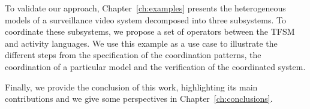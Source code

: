 To validate our approach, Chapter~\ref{ch:examples} presents the heterogeneous models of a surveillance video system decomposed into three subsystems. To coordinate these subsystems, we propose a set of \bcool operators between the TFSM and activity languages. We use this example as a use case to illustrate the different steps from the specification of the coordination patterns, the coordination of a particular model and the verification of the coordinated system.     

Finally, we provide the conclusion of this work, highlighting its main contributions and we give some perspectives in Chapter~\ref{ch:conclusions}.

	
	







